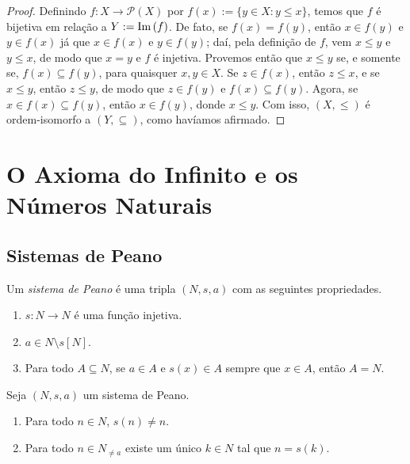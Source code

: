 \begin{proof}
    Definindo $f : X \to \mathcal{P}{(X)}$ por $f(x) := \{y \in X : y \leq x \}$, temos que $f$ é bijetiva em relação a $Y := \operatorname{Im}{(f)}$. De fato, se $f(x) = f(y)$, então $x \in f(y)$ e $y \in f(x)$ já que $x \in f(x)$ e $y \in f(y)$; daí, pela definição de $f$, vem $x \leq y$ e $y \leq x$, de modo que $x = y$ e $f$ é injetiva. Provemos então que $x \leq y$ se, e somente se, $f(x) \subseteq f(y)$, para quaisquer $x,y \in X$. Se $z \in f(x)$, então $z \leq x$, e se $x \leq y$, então $z \leq y$, de modo que $z \in f(y)$ e $f(x) \subseteq f(y)$. Agora, se $x \in f(x) \subseteq f(y)$, então $x \in f(y)$, donde $x \leq y$. Com isso, $(X, \leq)$ é ordem-isomorfo a $(Y, \subseteq)$, como havíamos afirmado. \blackproof
\end{proof}

\section{O Axioma do Infinito e os Números Naturais}

\subsection{Sistemas de Peano}

\begin{definition}
    Um \emph{sistema de Peano} é uma tripla $(N, s, a)$ com as seguintes propriedades.
        \begin{enumerate}[label=\roman*.]
            \item $s: N \to N$ é uma função injetiva.
            \item $a \in N \setminus s[N]$.
            \item Para todo $A \subseteq N$, se $a \in A$ e $s(x) \in A$ sempre que $x \in A$, então $A = N$.
        \end{enumerate}
\end{definition}

\begin{example}
    Seja $(N,s,a)$ um sistema de Peano.
        \begin{enumerate}[leftmargin=*, align=left, label=\textbf{(\alph*)}]
            \item Para todo $n \in N$, $s(n) \neq n$.
            \item Para todo $n \in N_{\neq a}$ existe um único $k \in N$ tal que $n = s(k)$.
        \end{enumerate}
\end{example}


